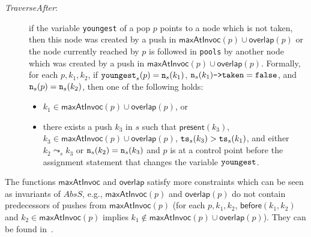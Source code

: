 \begin{description}
	\item[\emph{TraverseAfter}:] if the variable {\tt youngest} of a pop $p$ points to a node which is not taken, then this node was created by a push in $\mathsf{maxAtInvoc}(p)\cup \mathsf{overlap}(p)$ or the node currently reached by $p$ is followed in {\tt pools} by another node which was created by a push in $\mathsf{maxAtInvoc}(p)\cup \mathsf{overlap}(p)$. Formally,  for each $p, k_1,k_2$, if ${\tt youngest}_s(p)={\tt n}_s(k_1)$, ${\tt n}_s(k_1)\text{{\tt ->taken}}={\tt false}$, and ${\tt n}_s(p)={\tt n}_s(k_2)$, then one of the following holds:
	\begin{itemize}
		\item $k_1\in \mathsf{maxAtInvoc}(p)\cup \mathsf{overlap}(p)$, or 
		\item there exists a push $k_3$ in $s$ such that $\mathsf{present}(k_3)$, $k_3\in \mathsf{maxAtInvoc}(p)\cup \mathsf{overlap}(p)$, ${\tt ts}_s(k_3) > {\tt ts}_s(k_1)$, and either $k_2\leadsto_s k_3$ or ${\tt n}_s(k_2)={\tt n}_s(k_3)$ and $p$ is at a control point before the assignment statement that changes the variable ${\tt youngest}$.
	\end{itemize}
%	

\vspace{-2mm}
\end{description}
The functions $\mathsf{maxAtInvoc}$ and $\mathsf{overlap}$ satisfy more constraints which can be seen as invariants of $AbsS$, e.g., $\mathsf{maxAtInvoc}(p)$ and $\mathsf{overlap}(p)$ do not contain predecessors of pushes from $\mathsf{maxAtInvoc}(p)$ (for each $p, k_1, k_2$, $\mathsf{before}(k_1, k_2)$ and $k_2 \in \mathsf{maxAtInvoc}(p)$ implies $k_1\not\in \mathsf{maxAtInvoc}(p)\cup \mathsf{overlap}(p)$). They can be found in~\cite{extended}.

